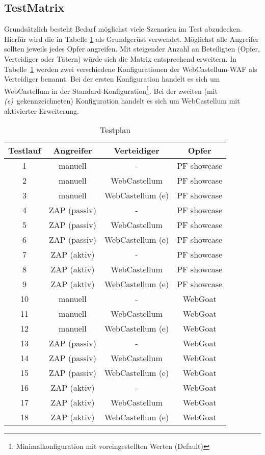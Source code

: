 \subsection{TestMatrix}
Grundsätzlich besteht Bedarf möglichst viele Szenarien im Test abzudecken. Hierfür wird die in Tabelle \ref{tab:testplan} als Grundgerüst verwendet. Möglichst alle Angreifer sollten jeweils jedes Opfer angreifen. Mit steigender Anzahl an Beteiligten (Opfer, Verteidiger oder Tätern) würde sich die Matrix entsprechend erweitern. In Tabelle~\ref{tab:testplan} werden zwei verschiedene Konfigurationen der WebCastellum-WAF als Verteidiger benannt. Bei der ersten Konfiguration handelt es sich um WebCastellum in der Standard-Konfiguration\footnote{Minimalkonfiguration mit voreingestellten Werten (Default)}. Bei der zweiten (mit \emph{(e)}\ gekennzeichneten) Konfiguration handelt es sich um WebCastellum mit aktivierter Erweiterung.

\begin{table}[h]
    \centering
    \begin{tabular}{cccc} 
      \toprule
    \textbf{Testlauf} & \textbf{Angreifer} & \textbf{Verteidiger} & \textbf{Opfer} \\ 
     \midrule
      1 & manuell & - & PF showcase\\
      2 & manuell & WebCastellum & PF showcase \\
      3 & manuell & WebCastellum (e) & PF showcase \\
      4 & ZAP (passiv) & - & PF showcase\\
      5 & ZAP (passiv) & WebCastellum & PF showcase \\
      6 & ZAP (passiv) & WebCastellum (e) & PF showcase \\
      7 & ZAP (aktiv) & - & PF showcase\\
      8 & ZAP (aktiv) & WebCastellum & PF showcase \\
      9 & ZAP (aktiv) & WebCastellum (e) & PF showcase \\
      10 & manuell & - & WebGoat \\ 
      11 & manuell & WebCastellum & WebGoat \\
      12 & manuell & WebCastellum (e) & WebGoat \\
      13 & ZAP (passiv) & - & WebGoat \\ 
      14 & ZAP (passiv) & WebCastellum & WebGoat \\
      15 & ZAP (passiv) & WebCastellum (e) & WebGoat \\
      16 & ZAP (aktiv) & - & WebGoat \\ 
      17 & ZAP (aktiv) & WebCastellum & WebGoat \\
      18 & ZAP (aktiv) & WebCastellum (e) & WebGoat \\
   \bottomrule
    \end{tabular}
    \caption{Testplan}
    \label{tab:testplan}
\end{table}

